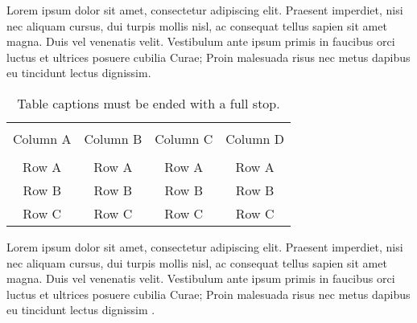 Lorem ipsum dolor sit amet, consectetur adipiscing elit. Praesent imperdiet, nisi nec aliquam cursus, dui turpis mollis nisl, ac consequat tellus sapien sit amet magna. Duis vel venenatis velit. Vestibulum ante ipsum primis in faucibus orci luctus et ultrices posuere cubilia Curae; Proin malesuada risus nec metus dapibus eu tincidunt lectus dignissim.

\begin{table*}[htp!]
	{\setlength{\tabcolsep}{14pt}
		\caption{Table captions must be ended with a full stop.}
		\begin{center}
			\vspace{-6mm}
			\begin{tabular}{cccc}
				\hline \\[-2.45ex] \hline \\[-2.1ex]
				Column A & Column B & Column C & Column D \\
				\hline \\[-2.1ex]
				Row A & Row A & Row A & Row A \\
				Row B & Row B & Row B & Row B \\
				Row C & Row C & Row C & Row C \\
				\hline
			\end{tabular}
			\vspace{-6mm}
		\end{center}
		\label{Table1.1}}
\end{table*}

Lorem ipsum dolor sit amet, consectetur adipiscing elit. Praesent imperdiet, nisi nec aliquam cursus, dui turpis mollis nisl, ac consequat tellus sapien sit amet magna. Duis vel venenatis velit. Vestibulum ante ipsum primis in faucibus orci luctus et ultrices posuere cubilia Curae; Proin malesuada risus nec metus dapibus eu tincidunt lectus dignissim \cite{1993JHyd..144..193B}.